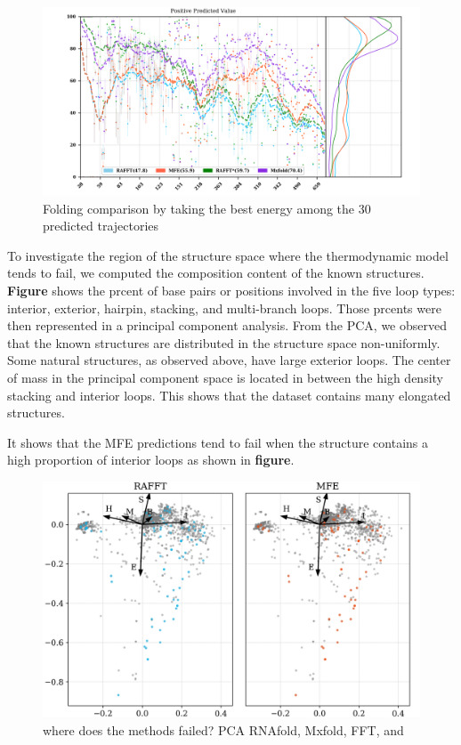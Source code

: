 \documentclass[a4paper,12pt]{article}
\begin{document}
{{\begin{figure}[htbp]
\centering
\includegraphics[width=.9\linewidth]{img/fold_perf_pvv.png}
\caption{Folding comparison by taking the best energy among the 30 predicted trajectories}
\end{figure}

To investigate the region of the structure space where the thermodynamic model
tends to fail, we computed the composition content of the known structures.
\textbf{Figure} shows the prcent of base pairs or positions involved in the five loop
types: interior, exterior, hairpin, stacking, and multi-branch loops. Those
prcents were then represented in a principal component analysis. From the PCA,
we observed that the known structures are distributed in the structure space
non-uniformly. Some natural structures, as observed above, have large exterior
loops. The center of mass in the principal component space is located in between
the high density stacking and interior loops. This shows that the dataset
contains many elongated structures.

It shows that the MFE predictions tend to fail when the structure contains a
high proportion of interior loops as shown in \textbf{figure}.

\begin{figure}[htbp]
\centering
\includegraphics[width=.9\linewidth]{img/comp_fails.png}
\caption{where does the methods failed? PCA RNAfold, Mxfold, FFT, and}
\end{figure}

}}
\end{document}
